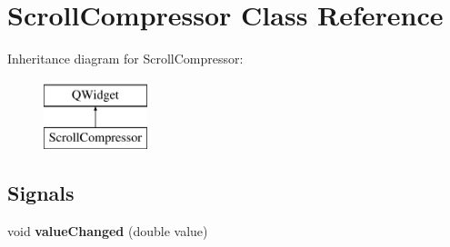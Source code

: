 \hypertarget{class_scroll_compressor}{\section{Scroll\-Compressor Class Reference}
\label{class_scroll_compressor}
}
Inheritance diagram for Scroll\-Compressor\-:\begin{figure}[H]
\begin{center}
\leavevmode
\includegraphics[height=2.000000cm]{class_scroll_compressor}
\end{center}
\end{figure}
\subsection*{Signals}
\begin{DoxyCompactItemize}
\item 
\hypertarget{class_scroll_compressor_aa6715db1cf90d26eacb8bc17014b55fc}{void {\bfseries value\-Changed} (double value)}\label{class_scroll_compressor_aa6715db1cf90d26eacb8bc17014b55fc}

\end{DoxyCompactItemize}
